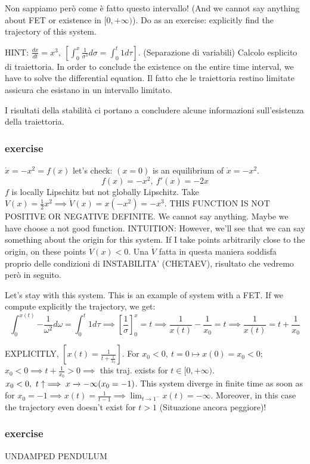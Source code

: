 Non sappiamo però come è fatto questo intervallo! (And we cannot say anything about FET or existence in $[0,+\infty)$). Do as an exercise: explicitly find the trajectory of this system.

HINT: $\frac{dx}{dt} = x^3,\ [\int_0^x{\frac{1}{\sigma^3}d\sigma} = \int_0^t{1d\tau}]$. (Separazione di variabili) Calcolo esplicito di traiettoria.
In order to conclude the existence on the entire time interval, we have to solve the differential equation. Il fatto che le traiettoria restino limitate assicura che esistano in un intervallo limitato.

I risultati della stabilità ci portano a concludere alcune informazioni sull'esistenza della traiettoria.

\subsubsection{exercise}

$\dot{x}=-x^2=f(x)$ let's check: $(x=0)$ is an equilibrium of $\dot{x}=-x^2$.
\[
	f(x) = -x^2,\ f'(x) = -2x
\]
$f$ is locally Lipschitz but not globally Lipschitz. Take $V(x)=\frac{1}{2}x^2 \implies \dot{V}(x) = x(-x^2) = -x^3$. THIS FUNCTION IS NOT POSITIVE OR NEGATIVE DEFINITE. We cannot say anything. Maybe we have choose a not good function. INTUITION: However, we'll see that we can say something about the origin for this system. If I take points arbitrarily close to the origin, on these points $\dot{V}(x) < 0$. Una $\dot{V}$ fatta in questa maniera soddisfa proprio delle condizioni di INSTABILITA' (CHETAEV), risultato che vedremo però in seguito.

Let's stay with this system. This is an example of system with a FET. If we compute explicitly the trajectory, we get: 
\[
	\int_0^{x(t)}{-\frac{1}{\omega^2}d\omega} = \int_0^t{1d\tau} \implies [\frac{1}{\sigma}]_{0}^x = t \implies \frac{1}{x(t)}-\frac{1}{x_0} = t \implies \frac{1}{x(t)}=t+\frac{1}{x_0}
\]

EXPLICITLY, $[x(t) = \frac{1}{t+\frac{1}{x_0}}]$. For $x_0 < 0,\ t=0 \mapsto x(0) = x_0 < 0$; $x_0 < 0 \implies t+\frac{1}{x_0} > 0 \implies$ this traj. exists for $t \in [0,+\infty)$. $x_0 < 0,\ t\uparrow \implies x \tendsto{} -\infty (x_0 = -1)$. This system diverge in finite time as soon as for $x_0 = -1 \implies x(t) = \frac{1}{t-1} \implies \lim_{t\to 1^-}{x(t)} = -\infty$. Moreover, in this case the trajectory even doesn't exist for $t>1$ (Situazione ancora peggiore)!

\subsubsection{exercise}{UNDAMPED PENDULUM}

